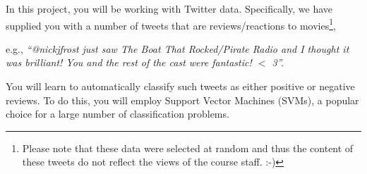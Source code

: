 \documentclass[11pt]{article}
\begin{document}
\newpage
{}\label{sec:intro}

In this project, you will be working with Twitter data. Specifically, we have supplied you with a number of tweets that are reviews/reactions to movies\footnote{Please note that these data were selected at random and thus the content of these tweets do not reflect the views of the course staff. :-)},

e.g., \textit{``@nickjfrost just saw The Boat That Rocked/Pirate Radio and I thought it was brilliant! You and the rest of the cast were fantastic! $<$ 3''.}

You will learn to automatically classify such tweets as either positive or negative reviews. To do this, you will employ Support Vector Machines (SVMs), a popular choice for a large number of classification problems.
\end{document}
